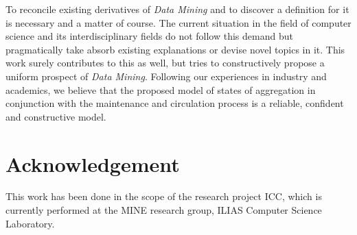\documentclass[10pt,latex8]{article}
\begin{document}


To reconcile existing derivatives of \textit{Data Mining} and to discover a definition for it is necessary and a matter of course. The current situation in the field of computer science and its interdisciplinary fields do not follow this demand but pragmatically take absorb existing explanations or devise novel topics in it. This work surely contributes to this as well, but tries to constructively propose a uniform prospect of \textit{Data Mining}. Following our experiences in industry and academics, we believe that the proposed model of states of aggregation in conjunction with the maintenance and circulation process is a reliable, confident and constructive model.

\section*{Acknowledgement}
This work has been done in the scope of the research project ICC, which is currently performed at the MINE research group, ILIAS Computer Science Laboratory. 
\end{document}
